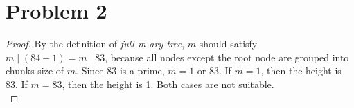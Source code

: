 \section*{Problem 2}
	\begin{proof}
		By the definition of \textit{full m-ary tree}, $m$ should satisfy $m \mid (84 - 1) = m \mid 83$, because all nodes except the root node are grouped into chunks size of $m$. Since 83 is a prime, $m = 1$ or 83. If $m = 1$, then the height is 83. If $m = 83$, then the height is 1. Both cases are not suitable.\\
	\end{proof}